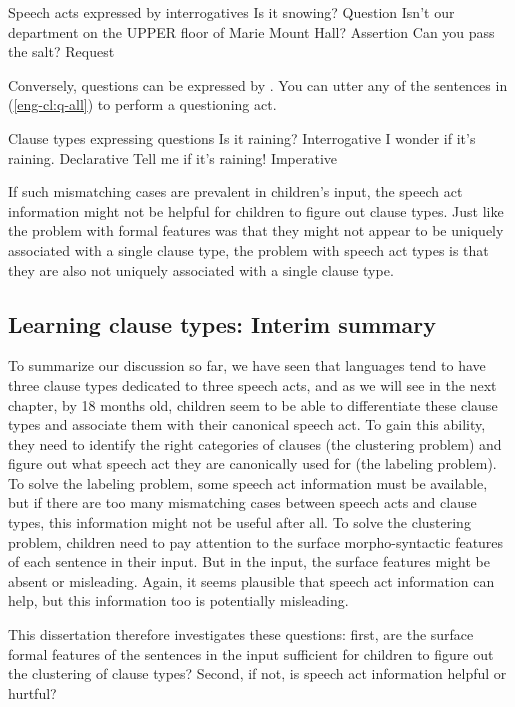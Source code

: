 Speech acts expressed by interrogatives 
\bxl Is it snowing? \hfill Question
\ex \label{eng-cl:int-asst} Isn't our department on the UPPER floor of Marie Mount Hall? \hspace*{\fill} Assertion
\ex\label{eng-cl:int-req} Can you pass the salt? \hfill Request
\exl
\eex

Conversely, questions can be expressed by \diis{}. You can utter any of the sentences in (\ref{eng-cl:q-all}) to perform a questioning act. 


Clause types expressing questions
\bxl
Is it raining? \hfill Interrogative
\ex I wonder if it's raining. \hfill Declarative
\ex Tell me if it's raining! \hfill Imperative
\exl
\eex

If such mismatching cases are prevalent in children's input, the speech act information might not be helpful for children to figure out clause types. Just like the problem with formal features was that they might not appear to be uniquely associated with a single clause type, the problem with speech act types is that they are also not uniquely associated with a single clause type.


\subsection{Learning clause types: Interim summary}
\label{sec:intro:hypo}

To summarize our discussion so far, we have seen that languages tend to have three clause types dedicated to three speech acts, and as we will see in the next chapter, by 18 months old, children seem to be able to differentiate these clause types and associate them with their canonical speech act. To gain this ability, they need to identify the right categories of clauses (the clustering problem) and figure out what speech act they are canonically used for (the labeling problem). To solve the labeling problem, some speech act information must be available, but if there are too many mismatching cases between speech acts and clause types, this information might not be useful after all. To solve the clustering problem, children need to pay attention to the surface morpho-syntactic features of each sentence in their input. But in the input, the surface features might be absent or misleading. Again, it seems plausible that speech act information can help, but this information too is potentially misleading.

This dissertation therefore investigates these questions: first, are the surface formal features of the sentences in the input sufficient for children to figure out the clustering of clause types? Second, if not, is speech act information helpful or hurtful? 

